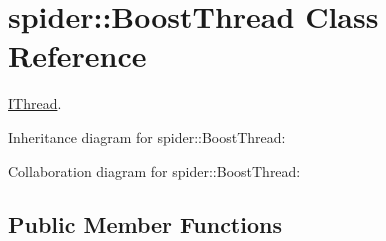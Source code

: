 \hypertarget{classspider_1_1_boost_thread}{}\section{spider\+:\+:Boost\+Thread Class Reference}
\label{classspider_1_1_boost_thread}


\hyperlink{classspider_1_1_i_thread}{I\+Thread}.  




Inheritance diagram for spider\+:\+:Boost\+Thread\+:


Collaboration diagram for spider\+:\+:Boost\+Thread\+:
\subsection*{Public Member Functions}
